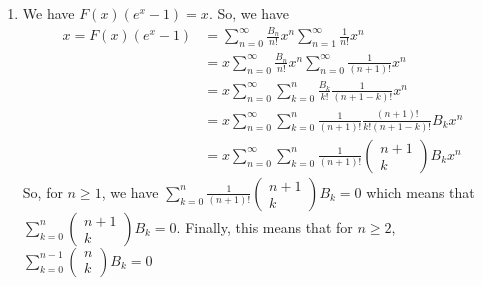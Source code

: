 \documentclass{article}
\begin{document}
\begin{enumerate}[label=\roman*)]
\item We have $F(x)(e^x-1) = x$. So, we have 
\begin{align*}
    x=F(x)(e^x-1) 
    &= \sum_{n=0}^\infty\frac{B_n}{n!}x^n \sum_{n=1}^\infty\frac{1}{n!}x^n\\
    &= x \sum_{n=0}^\infty\frac{B_n}{n!}x^n \sum_{n=0}^\infty\frac{1}{(n+1)!}x^{n}\\
    &= x \sum_{n=0}^\infty \sum_{k=0}^n \frac{B_k}{k!} \frac{1}{(n+1-k)!}x^{n}\\
    &= x \sum_{n=0}^\infty \sum_{k=0}^n \frac{1}{(n+1)!}\frac{(n+1)!}{k!(n+1-k)!} B_kx^{n}\\
    &= x \sum_{n=0}^\infty \sum_{k=0}^n \frac{1}{(n+1)!}
    \begin{pmatrix}
        n+1\\
        k
    \end{pmatrix} B_kx^{n}
\end{align*}
So, for $n\geq 1$, we have
$\sum_{k=0}^n \frac{1}{(n+1)!}
\begin{pmatrix}
    n+1\\
    k
\end{pmatrix} B_k = 0$
which means that 
$\sum_{k=0}^n 
\begin{pmatrix}
    n+1\\
    k
\end{pmatrix} B_k = 0$. Finally, this means that for $n\geq 2$, 
$\sum_{k=0}^{n-1} 
\begin{pmatrix}
    n\\
    k
\end{pmatrix} B_k = 0$
\end{enumerate}
\end{document}
